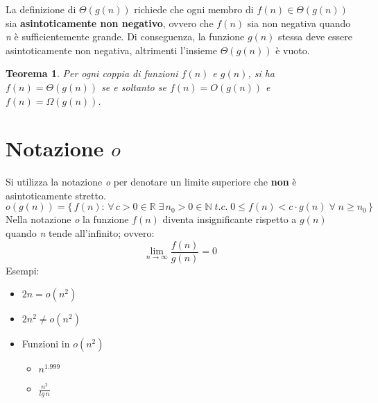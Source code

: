 \documentclass[10pt, a4paper]{report}
\newtheorem{theorem}{Teorema}[chapter]
\begin{document}
La definizione di $\Theta(g(n))$ richiede che ogni membro di $f(n) \in \Theta(g(n))$ sia \textbf{asintoticamente non negativo}, ovvero che $f(n)$ sia non negativa quando \textit{n} è sufficientemente grande. Di conseguenza, la funzione $g(n)$ stessa deve essere asintoticamente non negativa, altrimenti l'insieme $\Theta(g(n))$ è vuoto.
\begin{theorem}
Per ogni coppia di funzioni $f(n)$ e $g(n)$, si ha $f(n) = \Theta(g(n))$ se e soltanto se $f(n) = O(g(n))$ e $f(n) = \Omega(g(n))$.
\end{theorem}
\section{Notazione $o$}
Si utilizza la notazione \textit{o} per denotare un limite superiore che \textbf{non} è asintoticamente stretto.
\begin{equation*}
o(g(n)) = \{\,f(n) :\,\forall \,c > 0 \in\mathbb{R}\;\exists \,n_0 > 0 \in\mathbb{N}\;t.c.\;0\leq f(n) < c\cdot g(n)\;\forall\;n\geq n_0\,\}
\end{equation*}
Nella notazione \textit{o} la funzione $f(n)$ diventa insignificante rispetto a $g(n)$ quando \textit{n} tende all'infinito; ovvero:
\begin{equation*}
\lim_{n\to \infty} \frac{f(n)}{g(n)} = 0
\end{equation*}
Esempi:
\begin{itemize}
\item$2n = o(n^2)$
\item$2n^2 \neq o(n^2)$
\item Funzioni in $o(n^2)$
\begin{itemize}
\item$n^{1.999}$
\item$\frac{n^2}{lg\,n}$
\end{itemize}
\end{itemize}
\end{document}

